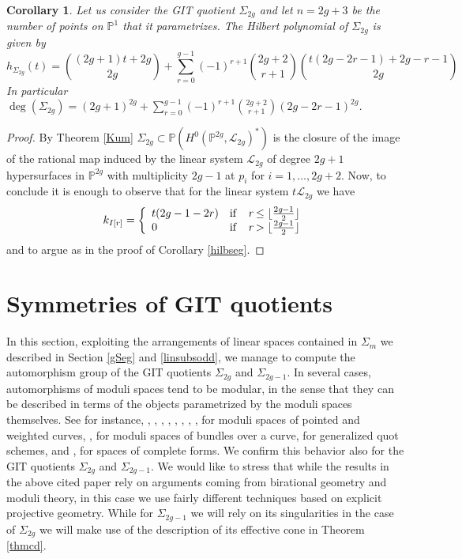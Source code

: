 \documentclass[a4paper,10pt]{amsart}
\newtheorem{Corollary}[thm]{Corollary}
\theoremstyle{definition}
\renewcommand{\P}{\mathbb{P}}
\begin{document}
\begin{Corollary}\label{hilbodd}
Let us consider the GIT quotient $\Sigma_{2g}$ and let $n=2g+3$ be the number of points on $\P^1$ that it parametrizes.
The Hilbert polynomial of $\Sigma_{2g}$ is given by 
$$h_{\Sigma_{2g}}(t) = \binom{(2g+1)t+2g}{2g}+\sum_{r=0}^{g-1}(-1)^{r+1}\binom{2g+2}{r+1}\binom{t(2g-2r-1)+2g-r-1}{2g}$$
In particular $\deg(\Sigma_{2g})= (2g+1)^{2g}+\sum_{r=0}^{g-1}(-1)^{r+1}\binom{2g+2}{r+1}(2g-2r-1)^{2g}$.
\end{Corollary}
\begin{proof}
By Theorem \ref{Kum} $\Sigma_{2g}\subset \mathbb{P}(H^0(\mathbb{P}^{2g},\mathcal{L}_{2g})^{*})$
is the closure of the image of the rational map induced by the linear system $\mathcal{L}_{2g}$ of degree $2g+1$ hypersurfaces in $\mathbb{P}^{2g}$ with multiplicity $2g-1$ at $p_i$ for $i = 1,\dots,2g+2$. Now, to conclude it is enough to observe that for the linear system $t\mathcal{L}_{2g}$ we have
$$
k_{I[r]}=
\left\lbrace\begin{array}{ll}
t(2g-1-2r) & \rm{if}\quad \textit{r}\leq \lfloor\frac{2\textit{g}-1}{2}\rfloor\\ 
0 & \rm{if} \quad \textit{r}> \lfloor\frac{2\textit{g}-1}{2}\rfloor
\end{array}\right. 
$$
and to argue as in the proof of Corollary \ref{hilbseg}.
\end{proof}

\section{Symmetries of GIT quotients}\label{secaut}
In this section, exploiting the arrangements of linear spaces contained in $\Sigma_{m}$ we described in Section \ref{gSeg} and \ref{linsubsodd}, we manage to compute the automorphism group of the GIT quotients $\Sigma_{2g}$ and $\Sigma_{2g-1}$. In several cases, automorphisms of moduli spaces tend to be modular, in the sense that they can be described in terms of the objects parametrized by the moduli spaces themselves. See for instance, \cite{BM13}, \cite{Ma}, \cite{MaM14}, \cite{MaM}, \cite{FM17}, \cite{Ma16}, \cite{FM17b}, \cite{Lin11}, \cite{Ro71} for moduli spaces of pointed and weighted curves, \cite{BGM13}, \cite{AFKM19} for moduli spaces of bundles over a curve, \cite{BM16} for generalized quot schemes, and \cite{Mas18}, \cite{Mas20} for spaces of complete forms. We confirm this behavior also for the GIT quotients $\Sigma_{2g}$ and $\Sigma_{2g-1}$. We would like to stress that while the results in the above cited paper rely on arguments coming from birational geometry and moduli theory, in this case we use fairly different techniques based on explicit projective geometry. While for $\Sigma_{2g-1}$ we will rely on its singularities in the case of $\Sigma_{2g}$ we will make use of the description of its effective cone in Theorem \ref{thmcd}.
\end{document}
